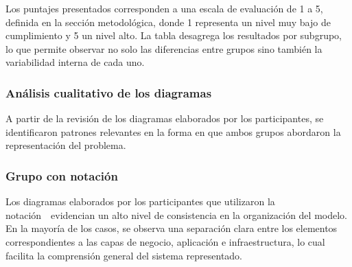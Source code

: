 \begin{table}[H]
\centering
\caption{Resumen comparativo de resultados en la actividad de diagramación}
\label{tab:resumen_diagramacion}
\end{table}

\noindent
\noindent
Los puntajes presentados corresponden a una escala de evaluación de 1 a 5, definida en la sección metodológica, donde 1 representa un nivel muy bajo de cumplimiento y 5 un nivel alto. La tabla desagrega los resultados por subgrupo, lo que permite observar no solo las diferencias entre grupos sino también la variabilidad interna de cada uno.

\FloatBarrier

\subsubsection{Análisis cualitativo de los diagramas}
\noindent
A partir de la revisión de los diagramas elaborados por los participantes, se identificaron patrones relevantes en la forma en que ambos grupos abordaron la representación del problema.

\subsubsection{Grupo con notación~\NDITI}
\noindent
Los diagramas elaborados por los participantes que utilizaron la notación~\NDITI~evidencian un alto nivel de consistencia en la organización del modelo. En la mayoría de los casos, se observa una separación clara entre los elementos correspondientes a las capas de negocio, aplicación e infraestructura, lo cual facilita la comprensión general del sistema representado.

